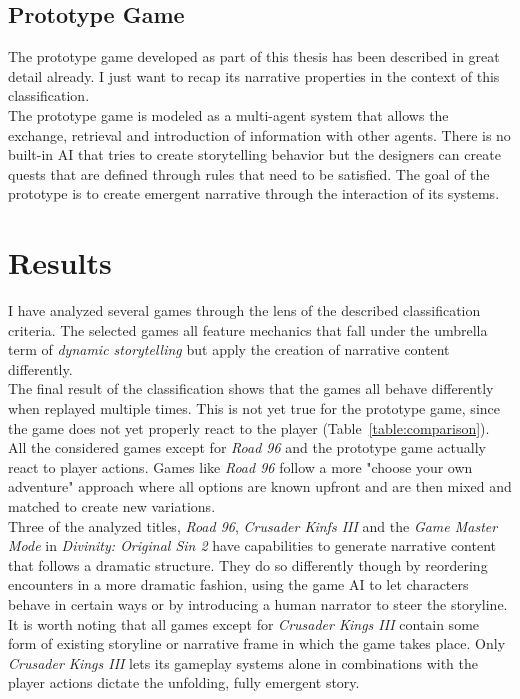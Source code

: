 \subsection{Prototype Game}
The prototype game developed as part of this thesis has been described in great detail already. I just want to recap its narrative properties in the context of this classification.\\
The prototype game is modeled as a multi-agent system that allows the exchange, retrieval and introduction of information with other agents. There is no built-in AI that tries to create storytelling behavior but the designers can create quests that are defined through rules that need to be satisfied. The goal of the prototype is to create emergent narrative through the interaction of its systems.
\section{Results}
I have analyzed several games through the lens of the described classification criteria. The selected games all feature mechanics that fall under the umbrella term of \textit{dynamic storytelling} but apply the creation of narrative content differently.\\
The final result of the classification shows that the games all behave differently when replayed multiple times. This is not yet true for the prototype game, since the game does not yet properly react to the player (Table~\ref{table:comparison}).\\
All the considered games except for \textit{Road 96} and the prototype game actually react to player actions. Games like \textit{Road 96} follow a more "choose your own adventure" approach where all options are known upfront and are then mixed and matched to create new variations.\\
Three of the analyzed titles, \textit{Road 96}, \textit{Crusader Kinfs III} and the \textit{Game Master Mode} in \textit{Divinity: Original Sin 2} have capabilities to generate narrative content that follows a dramatic structure. They do so differently though by reordering encounters in a more dramatic fashion, using the game AI to let characters behave in certain ways or by introducing a human narrator to steer the storyline.\\
It is worth noting that all games except for \textit{Crusader Kings III} contain some form of existing storyline or narrative frame in which the game takes place. Only \textit{Crusader Kings III} lets its gameplay systems alone in combinations with the player actions dictate the unfolding, fully emergent story. 
